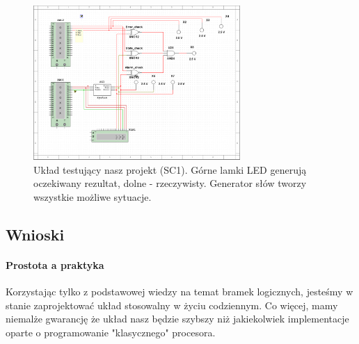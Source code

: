 \documentclass{article}
\begin{document}
\begin{figure}[H]
\includegraphics[width=0.7\textwidth]{testerMS}
\caption{Układ testujący nasz projekt (SC1). Górne lamki LED generują oczekiwany rezultat, dolne - rzeczywisty. Generator słów tworzy wszystkie możliwe sytuacje.}
\end{figure}


\subsection{Wnioski}
\paragraph{Prostota a praktyka}
Korzystając tylko z podstawowej wiedzy na temat bramek logicznych, jesteśmy w stanie zaprojektować układ stosowalny w życiu codziennym. Co więcej, mamy niemalże gwarancję że układ nasz będzie szybszy niż jakiekolwiek implementacje oparte o programowanie "klasycznego" procesora.
\end{document}
